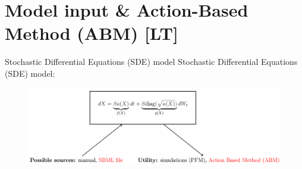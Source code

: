 \documentclass{beamer}
\begin{document}



\section{Model input \& Action-Based Method (ABM)  [LT]}

\begin{frame}{Stochastic Differential Equations (SDE) model}
Stochastic Differential Equations (SDE) model:
\begin{figure}
\includegraphics[width=\textwidth]{LT.PNG}
\end{figure}
\end{frame}
\end{document}
